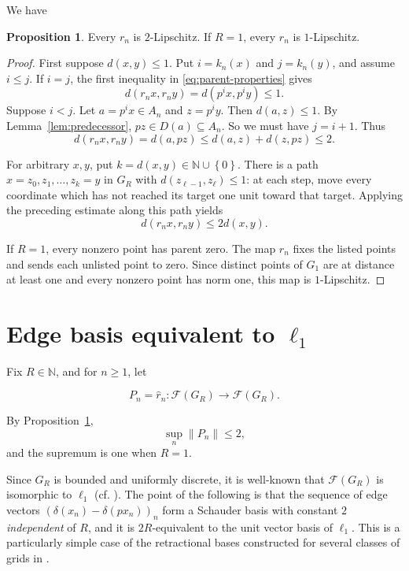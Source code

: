 \documentclass[11pt]{amsart}
\theoremstyle{definition}
\newtheorem{proposition}[theorem]{Proposition}
\newcommand{\F}{\mathcal F}
\newcommand{\norm}[1]{\lVert#1\rVert}
\newcommand{\set}[1]{\left\{#1\right\}}
\def\N{{\mathbb N}}
\begin{document}
We have

\begin{proposition}\label{prop:two-lipschitz}
Every $r_n$ is $2$-Lipschitz.  If $R=1$, every $r_n$ is $1$-Lipschitz.
\end{proposition}

\begin{proof}
First suppose $d(x,y)\le 1$. Put $i=k_n(x)$ and $j=k_n(y)$, and assume $i\le j$. If $i=j$, the first inequality in
\eqref{eq:parent-properties} gives
$$
       d(r_nx,r_ny)=d(p^ix,p^iy)\leq1.
$$
Suppose $i<j$. Let $a=p^ix\in A_n$ and $z=p^iy$. Then $d(a,z)\le 1$. By Lemma~\ref{lem:predecessor}, $pz\in D(a)\subseteq A_n$. So we must have $j=i+1$. Thus
$$
d(r_nx, r_ny)=d(a,pz)\le d(a,z)+d(z,pz)\le 2.
$$

For arbitrary $x,y$, put $k=d(x,y)\in\N\cup\set{0}$.  There is a path
$x=z_0,z_1,\ldots,z_k=y$ in $G_R$ with
$d(z_{\ell-1},z_\ell)\leq1$: at each step, move every coordinate which has
not reached its target one unit toward that target.  Applying the preceding
estimate along this path yields
$$
       d(r_nx,r_ny)\leq2d(x,y).
$$

If $R=1$, every nonzero point has parent zero.  The map $r_n$ fixes the
listed points and sends each unlisted point to zero.  Since distinct points of
$G_1$ are at distance at least one and every nonzero point has norm one, this
map is $1$-Lipschitz.

\end{proof}

\section{Edge basis equivalent to $\ell_1$}

Fix $R\in\N$, and for $n\ge 1$, let

$$P_n=\widehat r_n:\F(G_R)\to \F(G_R).$$

By Proposition~\ref{prop:two-lipschitz},
$$
\sup_n\norm{P_n}\leq2,
$$
and the supremum is one when $R=1$.

Since $G_R$ is bounded and uniformly discrete, it is well-known that $\F(G_R)$ is isomorphic to $\ell_1$ (cf. \cite{Weaver, Kalton2004}). The point of the following is that the sequence of edge vectors $(\delta(x_n)-\delta(px_n))_n$ form a Schauder basis with constant $2$ {\em independent} of $R$, and it is $2R$-equivalent to the unit vector basis of $\ell_1$. This is a particularly simple case of the retractional bases constructed for several classes of grids in \cite{HN, HM}.
\end{document}
